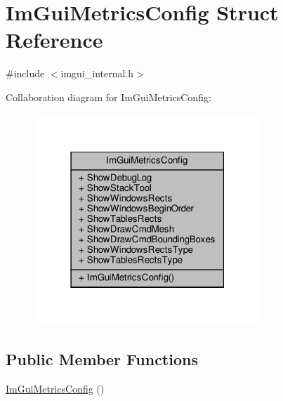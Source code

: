 \hypertarget{structImGuiMetricsConfig}{}\section{Im\+Gui\+Metrics\+Config Struct Reference}
\label{structImGuiMetricsConfig}


{\ttfamily \#include $<$imgui\+\_\+internal.\+h$>$}



Collaboration diagram for Im\+Gui\+Metrics\+Config\+:
\nopagebreak
\begin{figure}[H]
\begin{center}
\leavevmode
\includegraphics[width=243pt]{structImGuiMetricsConfig__coll__graph}
\end{center}
\end{figure}
\subsection*{Public Member Functions}
\begin{DoxyCompactItemize}
\item 
\hyperlink{structImGuiMetricsConfig_a7b531b4106a6f34ce645a3969b213920}{Im\+Gui\+Metrics\+Config} ()
\end{DoxyCompactItemize}
